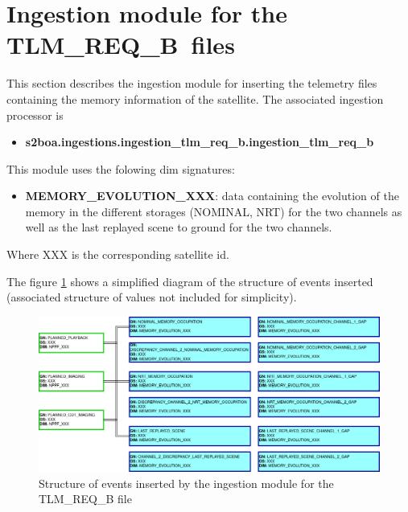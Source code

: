 \section{Ingestion module for the TLM\_REQ\_B\ files}

This section describes the ingestion module for inserting the telemetry files containing the memory information of the satellite.
The associated ingestion processor is 

\begin{itemize}
    \item \textbf{s2boa.ingestions.ingestion\_tlm\_req\_b.ingestion\_tlm\_req\_b}
\end{itemize}

This module uses the folowing \acrshort{dim} signatures:
\begin{itemize}
    \item \textbf{MEMORY\_EVOLUTION\_XXX}: data containing the evolution of the memory in the different storages (NOMINAL, NRT) for the two channels as well as the last replayed scene to ground for the two channels.
\end{itemize}

Where XXX is the corresponding satellite id.

The figure \ref{fig:structure_ingestion_tlm_req_b} shows a simplified diagram of the structure of events inserted (associated structure of values not included for simplicity).

\begin{figure}[H]
  \begin{center}
	\centering\includegraphics[width=170mm]{../fig/structure_ingestion_tlm_req_b.png}
	\caption{Structure of events inserted by the ingestion module for the TLM\_REQ\_B file}
	\label{fig:structure_ingestion_tlm_req_b}
  \end{center}
\end{figure}

